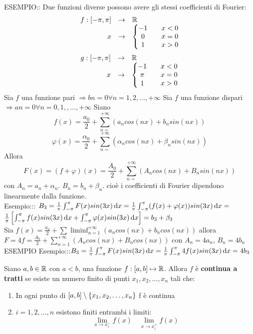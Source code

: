 ESEMPIO:: Due funzioni diverse possono avere gli stessi coefficienti di Fourier:
$$\begin{array}{rcl} f: \left[-\pi,\pi\right] & \to &  \mathbb{R} \\
x & \to & \left\{\begin{matrix} -1 && x<0\\0&&x= 0\\1&&x>0 \end{matrix}\right.\end{array}$$
$$\begin{array}{rcl} g: \left[-\pi,\pi\right] & \to &  \mathbb{R} \\
x & \to & \left\{\begin{matrix} -1 && x<0\\\pi&&x= 0\\1&&x>0 \end{matrix}\right.\end{array}$$
\observation
Sia $f$ una funzione pari $\Rightarrow bn=0 \forall n=1,2,\dotsc,+\infty$
\observation
Sia $f$ una funzione dispari $\Rightarrow an=0 \forall n=0,1,,\dotsc,+\infty$
\observation
Siano
$$f(x)=\frac{a_0}{2}+\sum\limits_{n=}^{+\infty}\left(a_ncos(nx)+b_nsin(nx)\right)$$
$$\varphi(x)=\frac{\alpha_0}{2}+\sum\limits_{n=}^{+\infty}\left(\alpha_ncos(nx)+\beta_nsin(nx)\right)$$
Allora
$$ F(x)=(f+\varphi)(x)=\frac{A_0}{2}+\sum\limits_{n=}^{+\infty}\left(A_ncos(nx)+B_nsin(nx)\right)$$
con $A_n=a_n+\alpha_n$. $B_n=b_n+\beta_n$.
cioè i coefficienti di Fourier dipendono linearmente dalla funzione.\\
Esempio::: $B_3=\frac{1}{\pi}\int_{-\pi}^{\pi}F(x)sin(3x)\,\mathrm{d}{x}=\frac{1}{\pi}\int_{-\pi}^{\pi}(f(x)+\varphi(x))sin(3x)\,\mathrm{d}{x}=$\\
$\frac{1}{\pi}\left[\int_{-\pi}^{\pi}f(x)sin(3x)\,\mathrm{d}{x}+\int_{-\pi}^{\pi}\varphi(x)sin(3x)\,\mathrm{d}{x}\right]=b_3+\beta_3$\\
Sia $f(x)=\frac{a_0}{2}+\sum\liminf_{n=1}^{+\infty}\left(a_ncos(nx)+b_ncos(nx)\right)$ allora $F=4f=\frac{A_0}{2}+\sum\limits_{n=1}^{+\infty}\left(A_ncos(nx)+B_ncos(nx)\right)$ con $A_n=4a_n$, $B_n=4b_n$\\
ESEMPIO
Esempio:::$B_3=\frac{1}{\pi}\int_{-\pi}^{\pi}F(x)sin(3x)\,\mathrm{d}{x}=\frac{1}{\pi}\int_{-\pi}^{\pi}4f(x)sin(3x)\,\mathrm{d}{x}=4b_3$\\
\begin{definition}
	Siano $a,b\in \mathbb{R}$ con $a<b$, una funzione $f:\left[a,b\right] \mapsto \mathbb{R}$. Allora $f$ è \textbf{continua a tratti} se esiste un numero finito di punti $x_1,x_2,\dotsc,x_n$ tali che:
	\begin{enumerate}
		\item In ogni punto di $\left[a,b\right]\setminus\left\{x_1,x_2,\dotsc,x_n\right\}$ f è continua
		\item $i=1,2,\dotsc,n$ esistono finiti entrambi i limiti:
		$$\lim\limits_{x\to x_i^{-}}f(x)\quad \lim\limits_{x\to x_i^{+}}f(x)$$
	\end{enumerate}
\end{definition}

